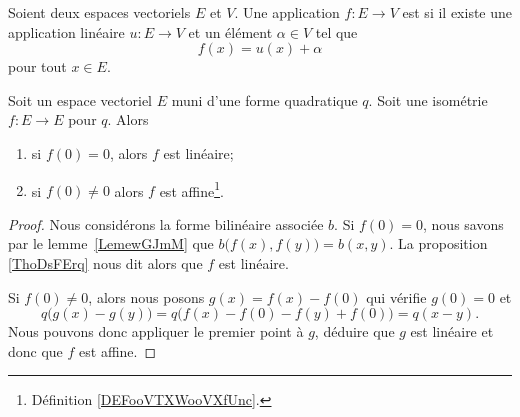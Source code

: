 {}

\begin{definition}      \label{DEFooVTXWooVXfUnc}
	Soient deux espaces vectoriels \( E\) et \( V\). Une application \( f\colon E\to V\) est  si il existe une application linéaire \( u\colon E \to V\) et un élément \( \alpha\in V\) tel que
	\begin{equation}
		f(x)=u(x)+\alpha
	\end{equation}
	pour tout \( x\in E\).
\end{definition}

\begin{theorem}		\label{THOooHSGHooNCLebs}
	Soit un espace vectoriel \( E\) muni d'une forme quadratique \( q\). Soit une isométrie \( f\colon E\to E\) pour \( q\). Alors
	\begin{enumerate}
		\item
		      si \( f(0)=0\), alors \( f\) est linéaire;
		\item
		      si \( f(0)\neq 0\) alors \( f\) est affine\footnote{Définition \ref{DEFooVTXWooVXfUnc}.}.
	\end{enumerate}
\end{theorem}

\begin{proof}
	Nous considérons la forme bilinéaire associée \( b\). Si \( f(0)=0\), nous savons par le lemme~\ref{LemewGJmM} que \( b\big( f(x),f(y) \big)=b(x,y)\). La proposition \ref{ThoDsFErq} nous dit alors que \( f\) est linéaire.


	Si \( f(0)\neq 0\), alors nous posons \( g(x)=f(x)-f(0)\) qui vérifie \( g(0)=0\) et
	\begin{equation}
		q\big( g(x)-g(y) \big)=q\big( f(x)-f(0)-f(y)+f(0) \big)=q(x-y).
	\end{equation}
	Nous pouvons donc appliquer le premier point à \( g\), déduire que \( g\) est linéaire et donc que \( f\) est affine.
\end{proof}

